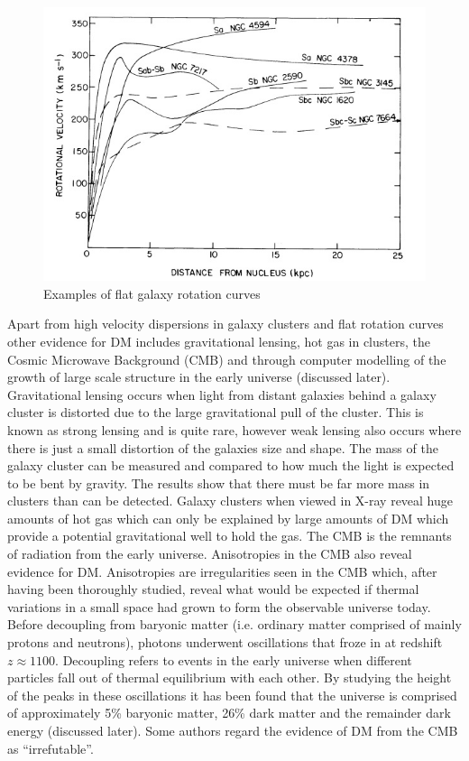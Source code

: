 \documentclass[a4paper,12pt]{article}
\begin{document}
\begin{figure}[H]
\centering
\includegraphics[width=.9\textwidth]{./rotationcurves.jpg}
\caption{Examples of flat galaxy rotation curves \citep{ruben}}
\label{fig:1}
\end{figure}

Apart from high velocity dispersions in galaxy clusters and flat rotation curves other evidence for DM includes gravitational lensing, hot gas in clusters, the Cosmic Microwave Background (CMB)
 and through computer modelling of the growth of 
large scale structure in the early universe (discussed later). Gravitational lensing occurs when light from distant galaxies behind a galaxy cluster is distorted due to the 
large gravitational pull of the cluster. This is known as strong lensing and is quite rare, however weak lensing also occurs where there is just a small distortion of the galaxies size
and shape. 
The mass of the galaxy cluster can be measured and compared to how much the light is expected to be bent by gravity. The results show that there must be far more mass in clusters 
than can be detected. Galaxy clusters when viewed in X-ray reveal huge amounts of hot gas which can only be explained by large amounts of DM which provide a potential gravitational well to hold the gas.
The CMB is the remnants of radiation from the early universe. Anisotropies in the CMB also reveal evidence for DM. Anisotropies are irregularities seen in the CMB which, after having been
thoroughly studied, reveal what would be expected if thermal variations in a small space had grown to form the observable universe today.
Before decoupling from baryonic matter (i.e. ordinary matter comprised of 
mainly protons and neutrons), photons underwent oscillations that froze in at redshift $z\approx1100$. Decoupling refers to events in the early universe when different
particles fall out of thermal equilibrium with each other.
By studying the height of the peaks in these oscillations it has been 
found that the universe is comprised of approximately 5\% baryonic matter, 26\% dark matter
and the remainder dark energy (discussed later). Some authors \citep{freese} regard the evidence of DM from the CMB as ``irrefutable''.
\end{document}

